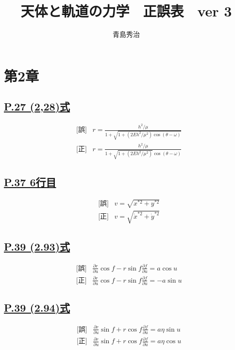 \documentclass[9pt,fleqn]{bxjsarticle}
\title{\vspace{-2cm}天体と軌道の力学　正誤表　ver 3}
\author{青島秀治}
\begin{document}
\maketitle

\section*{第2章}

\subsection*{\underline{P.27 (2,28)式}}
\begin{align*}
    &\text{[誤]} \hspace{10pt} r = \frac{h^2/\mu}{1+\sqrt{1+\left(2Eh^2/\mu^2\right)\cos{\left(\theta-\omega\right)}}} \\
    &\text{[正]} \hspace{10pt} r = \frac{h^2/\mu}{1+\sqrt{1+\left(2Eh^2/\mu^2\right)}\cos{\left(\theta-\omega\right)}}
\end{align*}

\subsection*{\underline{P.37 6行目}}
\begin{align*}
    &\text{[誤]} \hspace{10pt} v = \sqrt{x^{*2}+y^{*2}} \\
    &\text{[正]} \hspace{10pt} v = \sqrt{\dot{x}^{*2}+\dot{y}^{*2}}
\end{align*}

\subsection*{\underline{P.39 (2.93)式}}
\begin{align*}
    &\text{[誤]} \hspace{10pt} \frac{\partial{r}}{\partial{u}} \cos{f} - r\sin{f}\frac{\partial{f}}{\partial{u}} = a\cos{u} \\
    &\text{[正]} \hspace{10pt} \frac{\partial{r}}{\partial{u}} \cos{f} - r\sin{f}\frac{\partial{f}}{\partial{u}} = -a\sin{u}
\end{align*}

\subsection*{\underline{P.39 (2.94)式}}
\begin{align*}
    &\text{[誤]} \hspace{10pt} \frac{\partial{r}}{\partial{u}}\sin{f} + r\cos{f}\frac{\partial{f}}{\partial{u}} = a\eta\sin{u} \\
    &\text{[正]} \hspace{10pt} \frac{\partial{r}}{\partial{u}}\sin{f} + r\cos{f}\frac{\partial{f}}{\partial{u}} = a\eta\cos{u} 
\end{align*}
\end{document}
